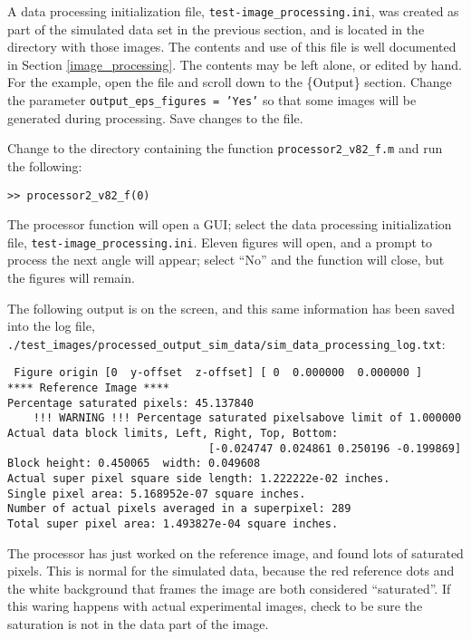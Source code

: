 A data processing initialization file, \texttt{test-image\_processing.ini}, was created as part of the simulated data set in the previous section, and is located in the directory with those images.  The contents and use of this file is well documented in Section \ref{image_processing}.  The contents may be left alone, or edited by hand.  For the example, open the file and scroll down to the \{Output\} section.  Change the parameter \texttt{output\_eps\_figures =  'Yes'} so that some images will be generated during processing.  Save changes to the file.

Change to the directory containing the function \texttt{processor2\_v82\_f.m} and run the following:

\begin{verbatim}
>> processor2_v82_f(0)
\end{verbatim}

The processor function will open a GUI; select the data processing initialization file, \texttt{test\allowbreak-image\_\allowbreak processing.ini}.  Eleven figures will open, and a prompt to process the next angle will appear; select ``No'' and the function will close, but the figures will remain.

The following output is on the screen, and this same information has been saved into the log file, \texttt{./test\_images/processed\_output\_sim\_data/sim\_data\_processing\_log.txt}:

\begin{verbatim}
 Figure origin [0  y-offset  z-offset] [ 0  0.000000  0.000000 ]  
**** Reference Image **** 
Percentage saturated pixels: 45.137840 
    !!! WARNING !!! Percentage saturated pixelsabove limit of 1.000000 
Actual data block limits, Left, Right, Top, Bottom: 
                               [-0.024747 0.024861 0.250196 -0.199869] 
Block height: 0.450065  width: 0.049608 
Actual super pixel square side length: 1.222222e-02 inches.
Single pixel area: 5.168952e-07 square inches.
Number of actual pixels averaged in a superpixel: 289
Total super pixel area: 1.493827e-04 square inches.
\end{verbatim}


The processor has just worked on the reference image, and found lots of saturated pixels.  This is normal for the simulated data, because the red reference dots and the white background that frames the image are both considered ``saturated''.  If this waring happens with actual experimental images, check to be sure the saturation is not in the data part of the image.


